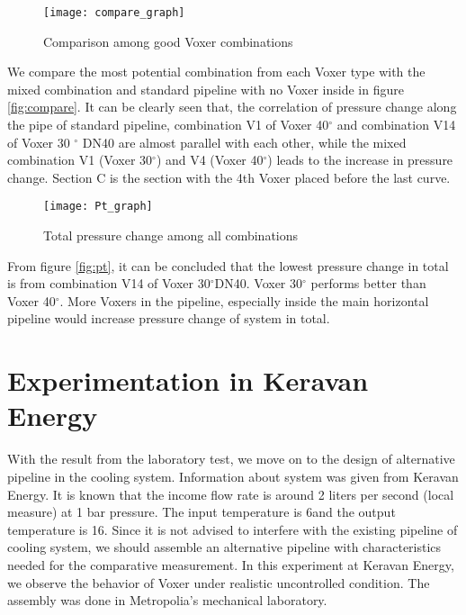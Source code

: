 \begin{figure}[h]
  \centering
  \texttt{[image: compare\_graph]}
  \caption{ Comparison among good Voxer combinations }
  \label{fig:compare}
\end{figure}
We compare the most potential combination from each Voxer type with the mixed combination and standard pipeline with no Voxer inside in figure \vref{fig:compare}. It can be clearly seen that, the correlation of pressure change along the pipe of standard pipeline, combination V1 of Voxer 40$^{\circ}$ and combination V14 of Voxer 30 $^{\circ}$ DN40 are almost parallel with each other, while the mixed combination V1 (Voxer 30$^{\circ}$) and V4 (Voxer 40$^{\circ}$) leads to the increase in pressure change. Section C is the section with the 4th Voxer placed before the last curve.
\begin{figure}[h]
  \centering
  \texttt{[image: Pt\_graph]}
  \caption{ Total pressure change among all combinations}
  \label{fig:pt}
\end{figure}
From figure \vref{fig:pt}, it can be concluded that the lowest pressure change in total is from combination V14 of Voxer 30$^{\circ}$DN40. Voxer 30$^{\circ}$ performs better than Voxer 40$^{\circ}$. More Voxers in the pipeline, especially inside the main horizontal pipeline would increase pressure change of system in total.  
\section{Experimentation in Keravan Energy}
With the result from the laboratory test, we move on to the design of alternative pipeline in the cooling system. Information about system was given from Keravan Energy. It is known that the income flow rate is around 2 liters per second (local measure) at 1 bar pressure. The input temperature is 6\celsius and the output temperature is 16\celsius. 
Since it is not advised to interfere with the existing pipeline of cooling system, we should assemble an alternative pipeline with characteristics needed for the comparative measurement. In this experiment at Keravan Energy, we observe the behavior of Voxer under realistic uncontrolled condition. The assembly was done in Metropolia's mechanical laboratory.  
